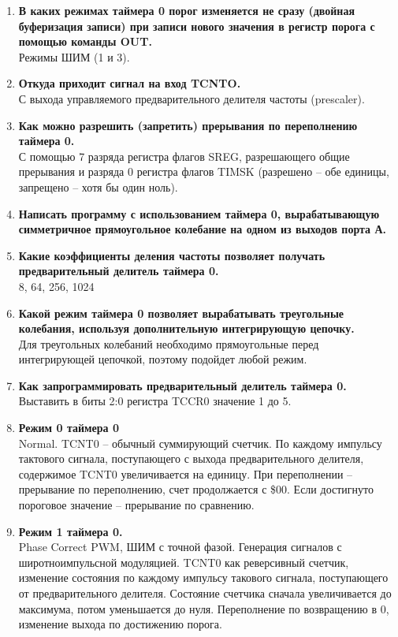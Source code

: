 \documentclass[a4paper, 12pt, twoside]{article}
\begin{document}
\begin{enumerate}
	\item \textbf{В каких режимах таймера 0 порог изменяется не сразу (двойная буферизация записи) при записи нового значения в регистр порога с помощью
команды OUT.}\\
		Режимы ШИМ (1 и 3).
	\item \textbf{Откуда приходит сигнал на вход TCNTO.}\\
		С выхода управляемого предварительного делителя частоты (prescaler).
	\item \textbf{Как можно разрешить (запретить) прерывания по переполнению таймера
0.}\\
С помощью 7 разряда регистра флагов SREG, разрешающего общие прерывания и
разряда 0 регистра флагов TIMSK (разрешено – обе единицы, запрещено – хотя бы
один ноль).
	\item \textbf{Написать программу с использованием таймера 0, вырабатывающую симметричное прямоугольное колебание на одном из выходов порта А.}
	\\
	\item \textbf{Какие коэффициенты деления частоты позволяет получать предварительный делитель таймера 0.}\\
		8, 64, 256, 1024
	\item \textbf{Какой режим таймера 0 позволяет вырабатывать треугольные колебания,
используя дополнительную интегрирующую цепочку.}\\
		Для треугольных колебаний необходимо прямоугольные перед интегрирующей цепочкой, поэтому подойдет любой режим.
	\item \textbf{Как запрограммировать предварительный делитель таймера 0.}\\
		Выставить в биты 2:0 регистра TCCR0 значение 1 до 5.
	\item \textbf{Режим 0 таймера 0}\\
		Normal. TCNT0 – обычный суммирующий счетчик. По каждому импульсу тактового сигнала, поступающего с выхода предварительного делителя, содержимое TCNT0 увеличивается на единицу. При переполнении – прерывание по переполнению, счет продолжается с \$00. Если достигнуто пороговое значение – прерывание по сравнению.
	\item \textbf{Режим 1 таймера 0.}\\
		Phase Correct PWM, ШИМ с точной фазой. Генерация сигналов с широтноимпульсной модуляцией. TCNT0 как реверсивный счетчик, изменение состояния по каждому импульсу такового сигнала, поступающего от предварительного делителя. Состояние счетчика сначала увеличивается до максимума, потом уменьшается до нуля. Переполнение по возвращению в 0, изменение выхода по достижению порога.

\end{enumerate}
\end{document}
